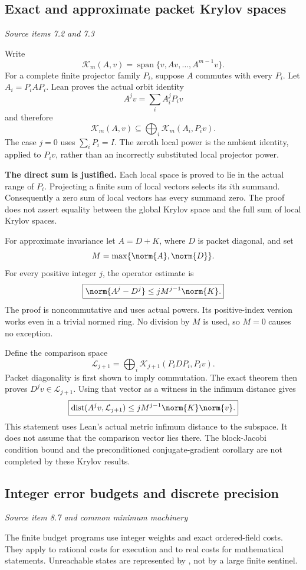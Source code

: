 \subsection{Exact and approximate packet Krylov spaces}\label{supp3:subsection:003}\textit{Source items 7.2 and 7.3}\par
Write
\[
\mathcal K_m(A,v)=\operatorname{span}\{v,Av,\ldots,A^{m-1}v\}.
\]
For a complete finite projector family $P_i$, suppose $A$ commutes with every $P_i$. Let $A_i=P_iAP_i$. Lean proves the actual orbit identity
\[
A^jv=\sum_i A_i^jP_iv
\]
and therefore
\[
\boxed{\mathcal K_m(A,v)\subseteq
\bigoplus_i\mathcal K_m(A_i,P_iv).}
\]
The case $j=0$ uses $\sum_iP_i=I$. The zeroth local power is the ambient identity, applied to $P_iv$, rather than an incorrectly substituted local projector power.

\textbf{The direct sum is justified.} Each local space is proved to lie in the actual range of $P_i$. Projecting a finite sum of local vectors selects its $i$th summand. Consequently a zero sum of local vectors has every summand zero. The proof does not assert equality between the global Krylov space and the full sum of local Krylov spaces.

For approximate invariance let $A=D+K$, where $D$ is packet diagonal, and set
\[
M=\max\{\norm{A},\norm{D}\}.
\]
For every positive integer $j$, the operator estimate is
\[
\boxed{\norm{A^j-D^j}\leq jM^{j-1}\norm{K}.}
\]
The proof is noncommutative and uses actual powers. Its positive-index version works even in a trivial normed ring. No division by $M$ is used, so $M=0$ causes no exception.

Define the comparison space
\[
\mathcal L_{j+1}=\bigoplus_i\mathcal K_{j+1}(P_iDP_i,P_iv).
\]
Packet diagonality is first shown to imply commutation. The exact theorem then proves $D^jv\in\mathcal L_{j+1}$. Using that vector as a witness in the infimum distance gives
\[
\boxed{\operatorname{dist}(A^jv,\mathcal L_{j+1})
\leq jM^{j-1}\norm{K}\norm{v}.}
\]
This statement uses Lean's actual metric infimum distance to the subspace. It does not assume that the comparison vector lies there. The block-Jacobi condition bound and the preconditioned conjugate-gradient corollary are not completed by these Krylov results.



\subsection{Integer error budgets and discrete precision}\label{supp3:subsection:004}\textit{Source item 8.7 and common minimum machinery}\par
The finite budget programs use integer weights and exact ordered-field costs. They apply to rational costs for execution and to real costs for mathematical statements. Unreachable states are represented by , not by a large finite sentinel.

